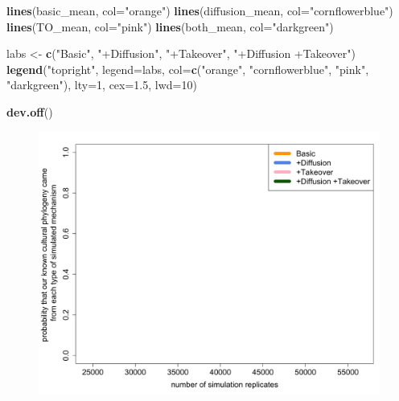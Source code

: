 \documentclass[]{book}
\newenvironment{Shaded}{\begin{snugshade}}{\end{snugshade}}
\newcommand{\KeywordTok}[1]{\textcolor[rgb]{0.13,0.29,0.53}{\textbf{{#1}}}}
\newcommand{\DataTypeTok}[1]{\textcolor[rgb]{0.13,0.29,0.53}{{#1}}}
\newcommand{\DecValTok}[1]{\textcolor[rgb]{0.00,0.00,0.81}{{#1}}}
\newcommand{\FloatTok}[1]{\textcolor[rgb]{0.00,0.00,0.81}{{#1}}}
\newcommand{\StringTok}[1]{\textcolor[rgb]{0.31,0.60,0.02}{{#1}}}
\newcommand{\NormalTok}[1]{{#1}}
\theoremstyle{definition}
\theoremstyle{definition}
\theoremstyle{definition}
\theoremstyle{remark}
\begin{document}
\begin{Shaded}
\begin{Highlighting}[]
\KeywordTok{lines}\NormalTok{(basic_mean,  }\DataTypeTok{col=}\StringTok{"orange"}\NormalTok{)}
\KeywordTok{lines}\NormalTok{(diffusion_mean,  }\DataTypeTok{col=}\StringTok{"cornflowerblue"}\NormalTok{)}
\KeywordTok{lines}\NormalTok{(TO_mean,  }\DataTypeTok{col=}\StringTok{"pink"}\NormalTok{)}
\KeywordTok{lines}\NormalTok{(both_mean,  }\DataTypeTok{col=}\StringTok{"darkgreen"}\NormalTok{)}

\NormalTok{labs <-}\StringTok{ }\KeywordTok{c}\NormalTok{(}\StringTok{"Basic"}\NormalTok{, }\StringTok{"+Diffusion"}\NormalTok{, }\StringTok{"+Takeover"}\NormalTok{, }\StringTok{"+Diffusion +Takeover"}\NormalTok{)}
\KeywordTok{legend}\NormalTok{(}\StringTok{"topright"}\NormalTok{, }\DataTypeTok{legend=}\NormalTok{labs, }\DataTypeTok{col=}\KeywordTok{c}\NormalTok{(}\StringTok{"orange"}\NormalTok{, }\StringTok{"cornflowerblue"}\NormalTok{, }\StringTok{"pink"}\NormalTok{, }\StringTok{"darkgreen"}\NormalTok{), }\DataTypeTok{lty=}\DecValTok{1}\NormalTok{, }\DataTypeTok{cex=}\FloatTok{1.5}\NormalTok{, }\DataTypeTok{lwd=}\DecValTok{10}\NormalTok{)}

\KeywordTok{dev.off}\NormalTok{()}
\end{Highlighting}
\end{Shaded}

\begin{figure}
\centering
\includegraphics{predictions.png}
\caption{}
\end{figure}
\end{document}
